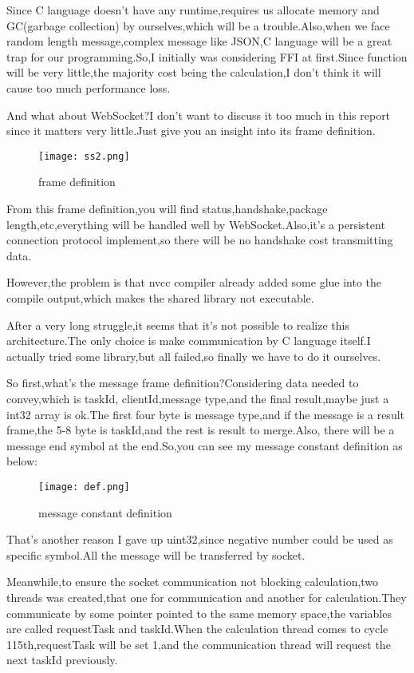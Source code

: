 \documentclass[12pt]{scrartcl} %
\begin{document}
Since C language doesn't have any runtime,requires us allocate memory and GC(garbage collection) by ourselves,which will be a trouble.Also,when we face random length message,complex message like JSON,C language will be a great trap for our programming.So,I initially was considering FFI at first.Since function will be very little,the majority cost being the calculation,I don't think it will cause too much performance loss.

And what about WebSocket?I don't want to discuss it too much in this report since it matters very little.Just give you an insight into its frame definition.
\begin{figure}[H]
    \centering
    \texttt{[image: ss2.png]}
    \caption{frame definition}
    \label{}
\end{figure}

From this frame definition,you will find status,handshake,package length,etc,everything will be handled well by WebSocket.Also,it's a persistent connection protocol implement,so there will be no handshake cost transmitting data.

However,the problem is that nvcc compiler already added some glue into the compile output,which makes the shared library not executable.

After a very long struggle,it seems that it's not possible to realize this architecture.The only choice is make communication by C language itself.I actually tried some library,but all failed,so finally we have to do it ourselves.

So first,what's the message frame definition?Considering data needed to convey,which is taskId, clientId,message type,and the final result,maybe just a int32 array is ok.The first four byte is message type,and if the message is a result frame,the 5-8 byte is taskId,and the rest is result to merge.Also, there will be a message end symbol at the end.So,you can see my message constant definition as below:
\begin{figure}[H]
    \centering
    \texttt{[image: def.png]}
    \caption{message constant definition}
    \label{}
\end{figure}
That's another reason I gave up uint32,since negative number could be used as specific symbol.All the message will be transferred by socket.

Meanwhile,to ensure the socket communication not blocking calculation,two threads was created,that one for communication and another for calculation.They communicate by some pointer pointed to the same memory space,the variables are called requestTask and taskId.When the calculation thread comes to cycle 115th,requestTask will be set 1,and the communication thread will request the next taskId previously.
\end{document}
